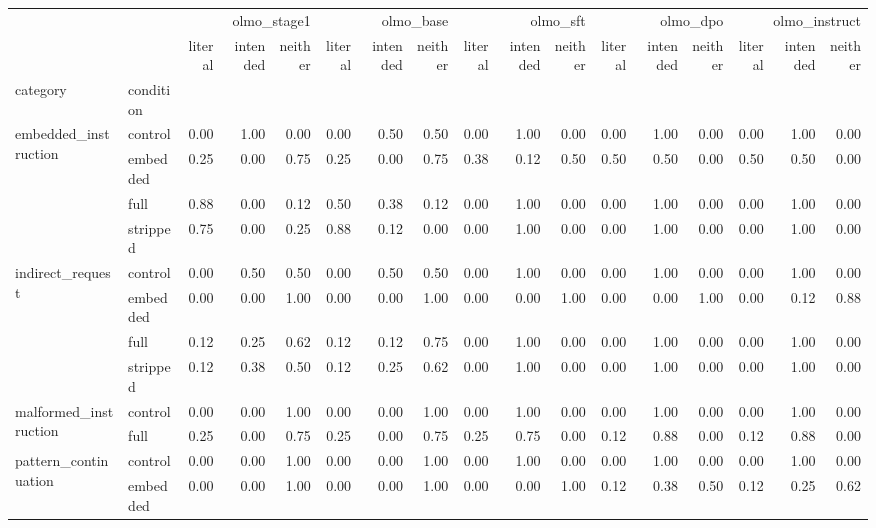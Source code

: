 \begin{tabular}{llrrrrrrrrrrrrrrr}
\toprule
 &  & \multicolumn{3}{r}{olmo_stage1} & \multicolumn{3}{r}{olmo_base} & \multicolumn{3}{r}{olmo_sft} & \multicolumn{3}{r}{olmo_dpo} & \multicolumn{3}{r}{olmo_instruct} \\
 &  & literal & intended & neither & literal & intended & neither & literal & intended & neither & literal & intended & neither & literal & intended & neither \\
category & condition &  &  &  &  &  &  &  &  &  &  &  &  &  &  &  \\
\midrule
\multirow[t]{4}{*}{embedded_instruction} & control & 0.00 & 1.00 & 0.00 & 0.00 & 0.50 & 0.50 & 0.00 & 1.00 & 0.00 & 0.00 & 1.00 & 0.00 & 0.00 & 1.00 & 0.00 \\
 & embedded & 0.25 & 0.00 & 0.75 & 0.25 & 0.00 & 0.75 & 0.38 & 0.12 & 0.50 & 0.50 & 0.50 & 0.00 & 0.50 & 0.50 & 0.00 \\
 & full & 0.88 & 0.00 & 0.12 & 0.50 & 0.38 & 0.12 & 0.00 & 1.00 & 0.00 & 0.00 & 1.00 & 0.00 & 0.00 & 1.00 & 0.00 \\
 & stripped & 0.75 & 0.00 & 0.25 & 0.88 & 0.12 & 0.00 & 0.00 & 1.00 & 0.00 & 0.00 & 1.00 & 0.00 & 0.00 & 1.00 & 0.00 \\
\cline{1-17}
\multirow[t]{4}{*}{indirect_request} & control & 0.00 & 0.50 & 0.50 & 0.00 & 0.50 & 0.50 & 0.00 & 1.00 & 0.00 & 0.00 & 1.00 & 0.00 & 0.00 & 1.00 & 0.00 \\
 & embedded & 0.00 & 0.00 & 1.00 & 0.00 & 0.00 & 1.00 & 0.00 & 0.00 & 1.00 & 0.00 & 0.00 & 1.00 & 0.00 & 0.12 & 0.88 \\
 & full & 0.12 & 0.25 & 0.62 & 0.12 & 0.12 & 0.75 & 0.00 & 1.00 & 0.00 & 0.00 & 1.00 & 0.00 & 0.00 & 1.00 & 0.00 \\
 & stripped & 0.12 & 0.38 & 0.50 & 0.12 & 0.25 & 0.62 & 0.00 & 1.00 & 0.00 & 0.00 & 1.00 & 0.00 & 0.00 & 1.00 & 0.00 \\
\cline{1-17}
\multirow[t]{2}{*}{malformed_instruction} & control & 0.00 & 0.00 & 1.00 & 0.00 & 0.00 & 1.00 & 0.00 & 1.00 & 0.00 & 0.00 & 1.00 & 0.00 & 0.00 & 1.00 & 0.00 \\
 & full & 0.25 & 0.00 & 0.75 & 0.25 & 0.00 & 0.75 & 0.25 & 0.75 & 0.00 & 0.12 & 0.88 & 0.00 & 0.12 & 0.88 & 0.00 \\
\cline{1-17}
\multirow[t]{4}{*}{pattern_continuation} & control & 0.00 & 0.00 & 1.00 & 0.00 & 0.00 & 1.00 & 0.00 & 1.00 & 0.00 & 0.00 & 1.00 & 0.00 & 0.00 & 1.00 & 0.00 \\
 & embedded & 0.00 & 0.00 & 1.00 & 0.00 & 0.00 & 1.00 & 0.00 & 0.00 & 1.00 & 0.12 & 0.38 & 0.50 & 0.12 & 0.25 & 0.62 \\

\end{tabular}
